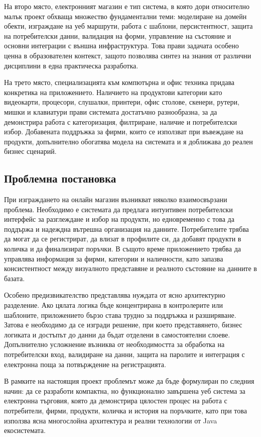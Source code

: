 На второ място, електронният магазин е тип система, в която дори относително малък проект обхваща множество фундаментални теми: моделиране на домейн обекти, изграждане на уеб маршрути, работа с шаблони, персистентност, защита на потребителски данни, валидация на форми, управление на състояние и основни интеграции с външна инфраструктура. Това прави задачата особено ценна в образователен контекст, защото позволява синтез на знания от различни дисциплини в една практическа разработка.

На трето място, специализацията към компютърна и офис техника придава конкретика на приложението. Наличието на продуктови категории като видеокарти, процесори, слушалки, принтери, офис столове, скенери, рутери, мишки и клавиатури прави системата достатъчно разнообразна, за да демонстрира работа с категоризация, филтриране, наличие и потребителски избор. Добавената поддръжка за фирми, които се използват при въвеждане на продукти, допълнително обогатява модела на системата и я доближава до реален бизнес сценарий.

\subsection{Проблемна постановка}

При изграждането на онлайн магазин възникват няколко взаимосвързани проблема. Необходимо е системата да предлага интуитивен потребителски интерфейс за разглеждане и избор на продукти, но едновременно с това да поддържа и надеждна вътрешна организация на данните. Потребителите трябва да могат да се регистрират, да влизат в профилите си, да добавят продукти в количка и да финализират поръчки. В същото време приложението трябва да управлява информация за фирми, категории и наличности, като запазва консистентност между визуалното представяне и реалното състояние на данните в базата.

Особено предизвикателство представлява нуждата от ясно архитектурно разделение. Ако цялата логика бъде концентрирана в контролерите или шаблоните, приложението бързо става трудно за поддръжка и разширяване. Затова е необходимо да се изгради решение, при което представянето, бизнес логиката и достъпът до данни да бъдат отделени в самостоятелни слоеве. Допълнително усложнение възниква от необходимостта за обработка на потребителски вход, валидиране на данни, защита на паролите и интеграция с електронна поща за потвърждение на регистрацията.

В рамките на настоящия проект проблемът може да бъде формулиран по следния начин: да се разработи компактна, но функционално завършена уеб система за електронна търговия, която да демонстрира цялостен процес на работа с потребители, фирми, продукти, количка и история на поръчките, като при това използва ясна многослойна архитектура и реални технологии от Java екосистемата.

